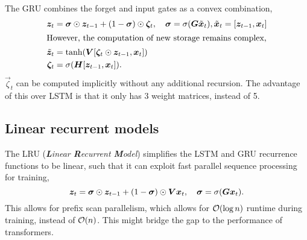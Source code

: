 The GRU combines the forget and input gates as a convex combination,
\begin{align*}
    \vec{z}_t         & = \vec{\sigma} \odot \vec{z}_{t-1} + (1 - \vec{\sigma}) \odot \vec{\zeta}_t, \quad \vec{\sigma} = \sigma \lft( \mat{G} \tilde{\vec{x}}_t \rgt), \tilde{\vec{x}}_t = \lft[ \vec{z}_{t-1}, \vec{x}_t \rgt] \\
    \intertext{However, the computation of new storage remains complex,}
    \tilde{\vec{z}}_t & = \tanh \lft( \mat{V} \lft[ \vec{\zeta}_t \odot \vec{z}_{t-1}, \vec{x}_t \rgt] \rgt)                                                                                                                     \\
    \vec{\zeta}_t     & = \sigma \lft( \mat{H} \lft[ \vec{z}_{t-1}, \vec{x}_t \rgt] \rgt).
\end{align*}
$\vec{\zeta}_t$ can be computed implicitly without any additional recursion. The advantage of this over LSTM is that it only has 3 weight matrices, instead of 5.

\subsection{Linear recurrent models}

The LRU (\textit{\textbf{L}inear \textbf{R}ecurrent \textbf{M}odel}) \citep{feng2024were}
simplifies the LSTM and GRU recurrence functions to be linear, such that it can exploit fast
parallel sequence processing for training, \[
    \vec{z}_t = \vec{\sigma} \odot \vec{z}_{t-1} + (1-\vec{\sigma}) \odot \mat{V} \vec{x}_t, \quad \vec{\sigma} = \sigma \lft( \mat{G} \vec{x}_t \rgt).
\]
This allows for prefix scan parallelism, which allows for $\bigo{\log n}$ runtime during training,
instead of $\bigo{n}$. This might bridge the gap to the performance of transformers.


